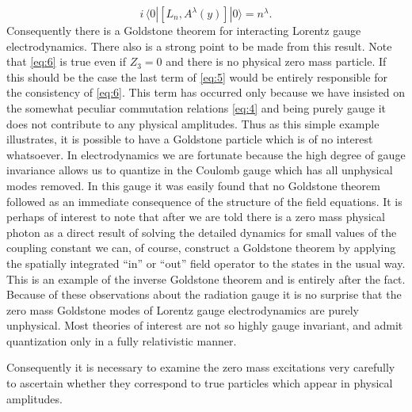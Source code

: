 \documentclass[%
  12pt,
  paper=letter,
  abstracton,
  pagesize=auto,
  version=last,
  DIV=calc
  ]{scrartcl}
\begin{document}
\begin{equation}
\label{eq:6}
i\, \langle 0|[L_n, A^\lambda(y)]|0\rangle = n^{\lambda}.
\end{equation}
Consequently there is a Goldstone theorem for interacting Lorentz
gauge electrodynamics.  There also is a strong point to be made from
this result. Note that \eqref{eq:6} is true even if $Z_3=0$ and there is no
physical zero mass particle.  If this should be the case the last term
of \eqref{eq:5} would be entirely responsible for the consistency of \eqref{eq:6}.
This term has occurred only because we have insisted on the somewhat
peculiar commutation relations \eqref{eq:4} and being purely gauge it does not
contribute to any physical amplitudes.  Thus as this simple example
illustrates, it is possible to have a Goldstone particle which is of
no interest whatsoever.  In electrodynamics we are fortunate because
the high degree of gauge invariance allows us to quantize in the
Coulomb gauge which has all unphysical modes removed.  In this gauge
it was easily found that no Goldstone theorem followed as an immediate
consequence of the structure of the field equations.  It is perhaps of
interest to note that after we are told there is a zero mass physical
photon as a direct result of solving the detailed dynamics for small
values of the coupling constant we can, of course, construct a
Goldstone theorem by applying the spatially integrated ``in'' or ``out''
field operator to the states in the usual way.  This is an example of
the inverse Goldstone theorem and is entirely after the fact.  Because
of these observations about the radiation gauge it is no surprise that
the zero mass Goldstone modes of Lorentz gauge electrodynamics are
purely unphysical.  Most theories of interest are not so highly gauge
invariant, and admit quantization only in a fully relativistic
manner.

Consequently it is necessary to examine the zero mass excitations very
carefully to ascertain whether they correspond to true particles which
appear in physical amplitudes.
\end{document}
